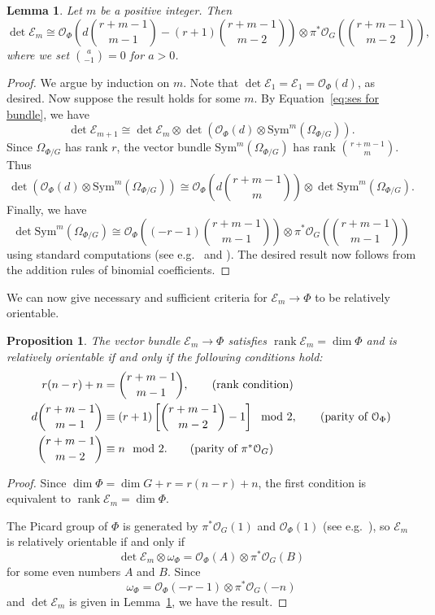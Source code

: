 \documentclass[12pt]{amsart}
\numberwithin{equation}{section}
\theoremstyle{plain}
\newtheorem{lem}[thm]{Lemma}
\newtheorem{prop}[thm]{Proposition}
\theoremstyle{definition}
\newcommand{\mc}[1]{\mathcal{#1}}
\newcommand{\rank}{\operatorname{rank}}
\newcommand{\Sym}{\mathrm{Sym}}
\begin{document}
\begin{lem}\label{lem:determinant of E_m}
    Let $m$ be a positive integer. Then
    \[\det\mc{E}_m\cong\mc{O}_\Phi\left(d\binom{r+m-1}{m-1}-(r+1)\binom{r+m-1}{m-2}\right)\otimes\pi^*\mc{O}_G\left(\binom{r+m-1}{m-2}\right),\]
    where we set $\binom{a}{-1}=0$ for $a>0$.
\end{lem}
\begin{proof}
    We argue by induction on $m$. Note that $\det\mc{E}_1=\mc{E}_1=\mc{O}_\Phi(d)$, as desired. Now suppose the result holds for some $m$. By Equation~\ref{eq:ses for bundle}, we have
    \[\det\mc{E}_{m+1}\cong\det\mc{E}_m\otimes\det(\mc{O}_\Phi(d)\otimes\Sym^m(\Omega_{\Phi/G})).\]
    Since $\Omega_{\Phi/G}$ has rank $r$, the vector bundle $\Sym^m(\Omega_{\Phi/G})$ has rank $\binom{r+m-1}{m}$. Thus
    \[\det(\mc{O}_\Phi(d)\otimes\Sym^m(\Omega_{\Phi/G}))\cong\mc{O}_\Phi\left(d\binom{r+m-1}{m}\right)\otimes\det\Sym^m(\Omega_{\Phi/G}).\]
    Finally, we have
    \[\det\Sym^m(\Omega_{\Phi/G})\cong\mc{O}_\Phi\left((-r-1)\binom{r+m-1}{m-1}\right)\otimes\pi^*\mc{O}_G\left(\binom{r+m-1}{m-1}\right)\]
    using standard computations (see e.g.~\cite[Exercise~II.5.16(c)]{MR0463157} and \cite[B.5.8]{MR1644323}). The desired result now follows from the addition rules of binomial coefficients.
\end{proof}

We can now give necessary and sufficient criteria for $\mc{E}_m\to\Phi$ to be relatively orientable.

\begin{prop}\label{prop:relatively orientable}
    The vector bundle $\mc{E}_m\to\Phi$ satisfies $\rank\mc{E}_m=\dim\Phi$ and is relatively orientable if and only if the following conditions hold:
    \begin{align*}
    r(n-r)+n &= \binom{r+m-1}{m-1}, \tag{rank condition} \\
    d\binom{r+m-1}{m-1} &\equiv (r+1)\left[\binom{r+m-1}{m-2}-1\right]\mod 2, \tag{parity of $\mc{O}_\Phi$}  \\
    \binom{r+m-1}{m-2} &\equiv n\mod 2.\tag{parity of $\pi^*\mc{O}_G$} 
    \end{align*}
\end{prop}
\begin{proof}
    Since $\dim\Phi=\dim{G}+r=r(n-r)+n$, the first condition is equivalent to $\rank\mc{E}_m=\dim\Phi$.
    
    The Picard group of $\Phi$ is generated by $\pi^*\mc{O}_G(1)$ and $\mc{O}_\Phi(1)$ (see e.g.~\cite[Exercise~II.7.9(a)]{MR0463157}), so $\mc{E}_m$ is relatively orientable if and only if
    \[\det\mc{E}_m\otimes\omega_\Phi=\mc{O}_\Phi(A)\otimes\pi^*\mc{O}_G(B)\]
    for some even numbers $A$ and $B$. Since 
    \[\omega_\Phi=\mc{O}_\Phi(-r-1)\otimes\pi^*\mc{O}_G(-n)\]
    and $\det\mc{E}_m$ is given in Lemma~\ref{lem:determinant of E_m}, we have the result.
\end{proof}
\end{document}
